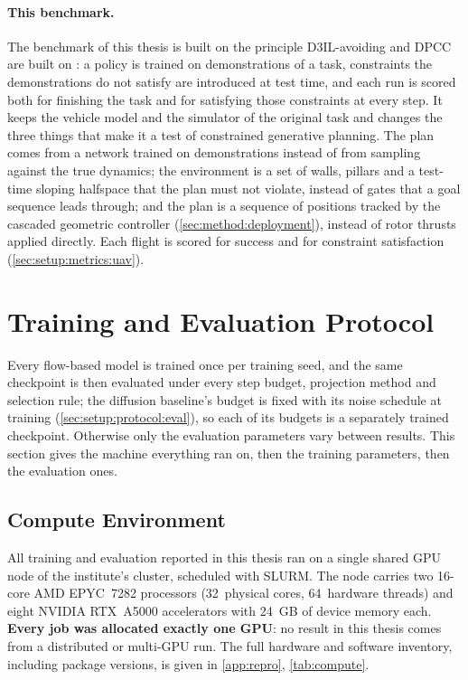 \paragraph{This benchmark.} The benchmark of this thesis is built on the principle D3IL-avoiding and
\ac{DPCC} are built on \parencite{jia2024towards,romer2025diffusion}: a policy is trained on
demonstrations of a task, constraints the demonstrations do not satisfy are introduced at test time, and
each run is scored both for finishing the task and for satisfying those constraints at every step. It
keeps the vehicle model and the simulator of the original task and
changes the three things that make it a test of constrained generative planning. The plan comes
from a network trained on demonstrations instead of from sampling against the true dynamics; the
environment is a set of walls, pillars and a test-time sloping halfspace that the plan must not violate, instead of
gates that a goal sequence leads through; and the plan is a sequence of positions tracked by the
cascaded geometric controller (\autoref{sec:method:deployment}), instead of rotor thrusts applied
directly. Each flight is scored for success and for constraint satisfaction (\autoref{sec:setup:metrics:uav}).

\section{Training and Evaluation Protocol}\label{sec:setup:protocol}

Every flow-based model is trained once per training seed, and the same checkpoint is then evaluated under
every step budget, projection method and selection rule; the diffusion baseline's budget is fixed with its
noise schedule at training (\autoref{sec:setup:protocol:eval}), so each of its budgets is a separately
trained checkpoint. Otherwise only the evaluation parameters vary between results. This
section gives the machine everything ran on, then the training parameters, then the evaluation ones.

\subsection{Compute Environment}\label{sec:setup:protocol:compute}

All training and evaluation reported in this thesis ran on a single shared GPU node of the
institute's cluster, scheduled with SLURM. The node carries two 16-core AMD EPYC~7282 processors
(32~physical cores, 64~hardware threads) and eight NVIDIA RTX~A5000 accelerators with 24~GB of
device memory each. \textbf{Every job was allocated exactly one GPU}: no result in this thesis comes
from a distributed or multi-GPU run. The full hardware and software inventory, including package
versions, is given in \autoref{app:repro}, \autoref{tab:compute}.

